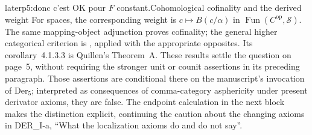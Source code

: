 \begin{dcomment}{later}{p5:donc c'est OK pour $F$ constant.}{Cohomological cofinality and the derived weight}
For spaces, the corresponding weight is $c\mapsto B(c/\alpha)$ in $\operatorname{Fun}(C^{\mathrm{op}},\mathcal S)$. The same mapping-object adjunction proves cofinality; the general higher categorical criterion is \citet[Theorem~4.1.3.1, together with Proposition~4.1.1.8]{Lurie2009HTT}, applied with the appropriate opposites. Its corollary~4.1.3.3 is Quillen's Theorem~A. These results settle the question on page~5, without requiring the stronger unit or counit assertions in its preceding paragraph. Those assertions are conditional there on the manuscript's invocation of $\mathrm{Der}_5$; interpreted as consequences of comma-category asphericity under present derivator axioms, they are false. The endpoint calculation in the next block makes the distinction explicit, continuing the caution about the changing axioms in DER\_I-a, ``What the localization axioms do and do not say''.
\end{dcomment}

